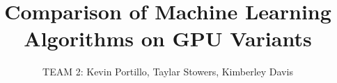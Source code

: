\documentclass[10pt]{article}
\begin{document}
\title{Comparison of Machine Learning Algorithms on GPU Variants}
\author{TEAM 2: Kevin Portillo, Taylar Stowers, Kimberley Davis}
\maketitle




\end{document}
